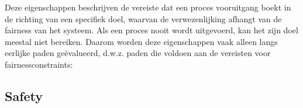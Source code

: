 \documentclass{article}
\begin{document}
	Deze eigenschappen beschrijven de vereiste dat een proces vooruitgang boekt in de richting van een specifiek doel, waarvan de verwezenlijking afhangt van de fairness van het systeem. Als een proces nooit wordt uitgevoerd, kan het zijn doel meestal niet bereiken. Daarom worden deze eigenschappen vaak alleen langs eerlijke paden geëvalueerd, d.w.z. paden die voldoen aan de   vereisten voor fairnessconstraints:
	
	
	\subsection{Safety}
	
	
\end{document}
